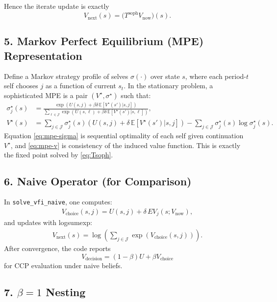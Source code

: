 \documentclass[a4paper, 11pt]{article}
\newcommand{\E}{\mathbb{E}}
\begin{document}
\noindent Hence the iterate update is exactly
\[
V_{\text{next}}(s)=\big(T^{\text{soph}}V_{\text{now}}\big)(s).
\]

\subsection*{5. Markov Perfect Equilibrium (MPE) Representation}

\noindent Define a Markov strategy profile of selves \(\sigma(\cdot)\) over state \(s\), where each period-\(t\) self chooses \(j\) as a function of current \(s_t\). In the stationary problem, a sophisticated MPE is a pair \((V^\star,\sigma^\star)\) such that:
\begin{align}
\sigma^\star_j(s)
&= \frac{\exp\!\left(U(s,j)+\beta\delta\,\E[V^\star(s')|s,j]\right)}
{\sum_{\ell\in\mathcal{J}}\exp\!\left(U(s,\ell)+\beta\delta\,\E[V^\star(s')|s,\ell]\right)}, \label{eq:mpe-sigma}\\
V^\star(s)
&= \sum_{j\in\mathcal{J}}\sigma^\star_j(s)\left(U(s,j)+\delta\,\E[V^\star(s')|s,j]\right)
- \sum_{j\in\mathcal{J}}\sigma^\star_j(s)\log \sigma^\star_j(s). \label{eq:mpe-v}
\end{align}
Equation \eqref{eq:mpe-sigma} is sequential optimality of each self given continuation \(V^\star\),
and \eqref{eq:mpe-v} is consistency of the induced value function.
This is exactly the fixed point solved by \eqref{eq:Tsoph}.

\subsection*{6. Naive Operator (for Comparison)}

\noindent In \texttt{solve\_vfi\_naive}, one computes:
\begin{align}
V_{\text{choice}}(s,j)=U(s,j)+\delta\,EV_j(s;V_{\text{now}}),
\end{align}
and updates with logsumexp:
\begin{align}
V_{\text{next}}(s)=\log\!\left(\sum_{j\in\mathcal{J}}\exp(V_{\text{choice}}(s,j))\right).
\label{eq:naive-main}
\end{align}
After convergence, the code reports
\[
V_{\text{decision}}=(1-\beta)U+\beta V_{\text{choice}}
\]
for CCP evaluation under naive beliefs.

\subsection*{7. \(\beta=1\) Nesting}
\end{document}
